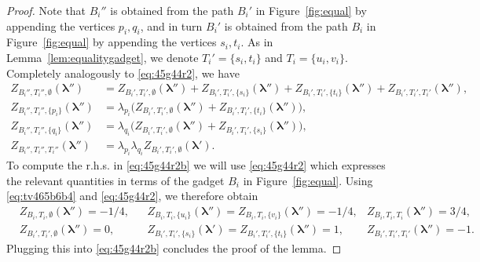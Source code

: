 \documentclass[11pt]{article}
\def\lambdab{\ensuremath{\boldsymbol{\lambda}}}
\begin{document}
\begin{proof}
Note that $B_i''$ is obtained from the path $B_i'$ in Figure~\ref{fig:equal} by appending the vertices $p_i,q_i$, and in turn $B_i'$ is obtained from the path $B_i$ in Figure~\ref{fig:equal} by appending the vertices $s_i,t_i$. As in Lemma~\ref{lem:equalitygadget}, we denote $T_i'=\{s_i,t_i\}$ and $T_i=\{u_i,v_i\}$. Completely analogously to \eqref{eq:45g44r2}, we have  
\begin{equation}\label{eq:45g44r2b}
\begin{aligned}
Z_{B_i'',T_i'',\emptyset}(\lambdab'')& = Z_{B_i',T_i',\emptyset}(\lambdab'')+Z_{B_i',T_i',\{s_i\}}(\lambdab'')+Z_{B_i',T_i',\{t_i\}}(\lambdab'')+Z_{B_i',T_i',T_i'}(\lambdab''),\\
Z_{B_i'',T_i'',\{p_i\}}(\lambdab'')&=\lambda_{p_i}\big(Z_{B_i',T_i',\emptyset}(\lambdab'')+Z_{B_i',T_i',\{t_i\}}(\lambdab'')\big),\\
Z_{B_i'',T_i'',\{q_{i}\}}(\lambdab'')&= \lambda_{q_i}\big(Z_{B_i',T_i',\emptyset}(\lambdab'')+Z_{B_i',T_i',\{s_i\}}(\lambdab'')\big),\\
Z_{B_i'',T_i'',T_i''}(\lambdab'')&=\lambda_{p_i}\lambda_{q_i}Z_{B_i',T_i',\emptyset}(\lambdab').
\end{aligned} 
\end{equation}
To compute the r.h.s. in \eqref{eq:45g44r2b} we will use \eqref{eq:45g44r2}  which expresses the relevant quantities in terms of the gadget  $B_i$ in Figure~\ref{fig:equal}. Using \eqref{eq:tv465b6b4}  and \eqref{eq:45g44r2}, we therefore obtain
\begin{align*}
&Z_{B_i,T_i,\emptyset}(\lambdab'')=-1/4,& &Z_{B_i,T_i,\{u_i\}}(\lambdab'')=Z_{B_i,T_i,\{v_i\}}(\lambdab'')=-1/4,& Z_{B_i,T_i,T_i}(\lambdab'')=3/4,\\
&Z_{B_i',T_i',\emptyset}(\lambdab'')=0,& &Z_{B_i',T_i',\{s_i\}}(\lambdab')=Z_{B_i',T_i',\{t_i\}}(\lambdab'')=1,& Z_{B_i',T_i',T_i'}(\lambdab'')=-1.
\end{align*}
Plugging this into \eqref{eq:45g44r2b} concludes the proof of the lemma.
\end{proof}
\end{document}

